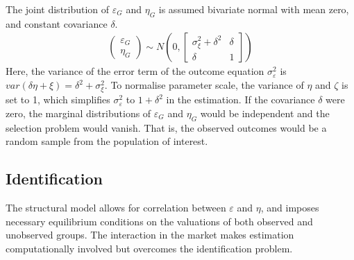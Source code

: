 The joint distribution of $\varepsilon_G$ and $\eta_G$ is assumed bivariate normal with mean zero, and constant covariance $\delta$.
\begin{eqnarray} \label{Eqn:JointErrorTermDistribution}
\left( \begin{matrix} 
\varepsilon_G \\ 
\eta_G
\end{matrix} \right) \sim N
\left( 0, \left[ \begin{matrix} 
\sigma^2_{\xi} +\delta^2 & \delta \\ 
\delta & 1
\end{matrix} \right] \right)
\end{eqnarray}
Here, the variance of the error term of the outcome equation $\sigma^2_{\varepsilon}$ is $var(\delta\eta + \xi) = \delta^2 + \sigma^2_{\xi}$. To normalise parameter scale, the variance of $\eta$ and $\zeta$ is set to 1, which simplifies $\sigma^2_{\varepsilon}$ to $1 + \delta^2$ in the estimation. If the covariance $\delta$ were zero, the marginal distributions of $\varepsilon_G$ and $\eta_G$ would be independent and the selection problem would vanish. That is, the observed outcomes would be a random sample from the population of interest.


\subsection{Identification}

The structural model allows for correlation between $\varepsilon$ and $\eta$, and imposes necessary equilibrium conditions on the valuations of both observed and unobserved groups. The interaction in the market makes estimation computationally involved but overcomes the identification problem. 

